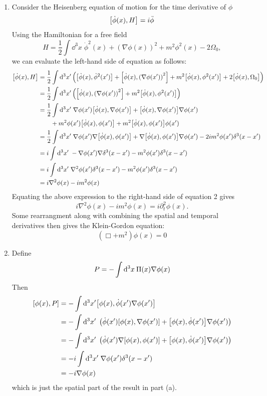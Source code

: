 \documentclass[12pt]{article}
\begin{document}
\begin{enumerate}[label=(\alph*)]
    \item Consider the Heisenberg equation of motion for the time derivative of $\phi$
    \begin{equation}\label{2} \comm{\dot{\phi}(x)}{H} = i\ddot{\phi}\end{equation}
    Using the Hamiltonian for a free field
    \[ H = \frac{1}{2}\int\dd^3x \; \dot{\phi}^2(x) + \left(\nabla\phi(x)\right)^2 + m^2\phi^2(x) - 2\Omega_0, \]
    we can evaluate the left-hand side of equation  as follows:
    \begin{align*}
        \comm{\dot{\phi}(x)}{H} &= \frac{1}{2}\int\dd^3x' \left(\comm{\dot{\phi}(x)}{\dot{\phi}^2(x')} + \comm{\dot{\phi}(x)}{\left(\nabla\phi(x')\right)^2} + m^2\comm{\dot{\phi}(x)}{\phi^2(x')} + 2\comm{\dot{\phi}(x)}{\Omega_0} \right) \\
        &= \frac{1}{2}\int\dd^3x' \left(\comm{\dot{\phi}(x)}{\left(\nabla\phi(x')\right)^2} + m^2\comm{\dot{\phi}(x)}{\phi^2(x')}\right) \\
        &= \frac{1}{2}\int\dd^3x' \; \nabla\phi(x')\comm{\dot{\phi}(x)}{\nabla\phi(x')} + \comm{\dot{\phi}(x)}{\nabla\phi(x')}\nabla\phi(x') \\ 
        &\qquad + m^2\phi(x')\comm{\dot{\phi}(x)}{\phi(x')} + m^2\comm{\dot{\phi}(x)}{\phi(x')}\phi(x') \\  
        &= \frac{1}{2}\int\dd^3x' \; \nabla\phi(x')\nabla\comm{\dot{\phi}(x)}{\phi(x')} + \nabla\comm{\dot{\phi}(x)}{\phi(x')}\nabla\phi(x') - 2im^2\phi(x')\delta^3(x-x') \\
        &= i\int\dd^3x' \; -\nabla\phi(x')\nabla\delta^3(x-x') - m^2\phi(x')\delta^3(x-x') \\
        &= i\int\dd^3x' \; \nabla^2\phi(x')\delta^3(x-x') - m^2\phi(x')\delta^3(x-x') \\
        &= i\nabla^2\phi(x) - im^2\phi(x)
    \end{align*}
    Equating the above expression to the right-hand side of equation 2 gives
    \[ i\nabla^2\phi(x) - im^2\phi(x) = i\partial_t^2\phi(x). \]
    Some rearrangment along with combining the spatial and temporal derivatives then gives the Klein-Gordon equation:
    \[ \left(\Box + m^2\right)\phi(x) = 0 \]

    \item Define
    \[ \boldmath{P} = -\int\dd^3x\:\Pi(x)\nabla\phi(x) \]
    Then
    \begin{align*}
        \comm{\phi(x)}{\boldmath{P}} &= -\int\dd^3x'\comm{\phi(x)}{\dot{\phi}(x')\nabla\phi(x')} \\
        &= -\int\dd^3x' \; \left(\dot{\phi}(x')\comm{\phi(x)}{\nabla\phi(x')} + \comm{\phi(x)}{\dot{\phi}(x')}\nabla\phi(x') \right) \\
        &= -\int\dd^3x' \; \left(\dot{\phi}(x')\nabla\comm{\phi(x)}{\phi(x')} + \comm{\phi(x)}{\dot{\phi}(x')}\nabla\phi(x') \right) \\
        &= -i\int\dd^3x' \; \nabla\phi(x')\delta^3(x-x') \\
        &= -i\nabla\phi(x)
    \end{align*}
    which is just the spatial part of the result in part (a).


\end{enumerate}
\end{document}
